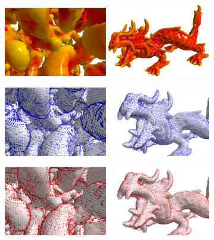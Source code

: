 \documentclass{llncs}
\begin{document}
 \begin{figure}[h!]
   \vspace{-0.35cm}
   \begin{center}
   	 {\includegraphics[width=0.4\textwidth]{figs/snow_r8}}
   	 {\includegraphics[width=0.4\textwidth]{figs/xyzrgb_dragon-510_R8_mean}}

     {\includegraphics[width=0.4\textwidth]{figs/snow_r8_min}}
	 {\includegraphics[width=0.4\textwidth]{figs/dragon_r8}}

     {\includegraphics[width=0.4\textwidth]{figs/snow_r8_max}}
	 {\includegraphics[width=0.4\textwidth]{figs/dragon_r8_max}}


\end{center}
\end{figure}
\end{document}
